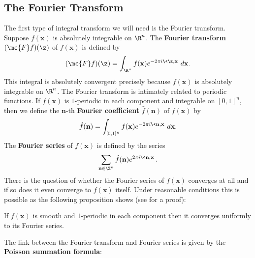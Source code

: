     \subsection*{The Fourier Transform}
      The first type of integral transform we will need is the Fourier transform. Suppose $f(\mathbf{x})$ is absolutely integrable on $\R^{n}$. The \textbf{Fourier transform} $(\mc{F}f)(\boldsymbol{\z})$ of $f(\mathbf{x})$ is defined by
      \[
        (\mc{F}f)(\boldsymbol{\z}) = \int_{\R^{n}}f(\mathbf{x})e^{-2\pi i\<\boldsymbol{\z},\mathbf{x}\>}\,d\mathbf{x}.
      \]
      This integral is absolutely convergent precisely because $f(\mathbf{x})$ is absolutely integrable on $\R^{n}$. The Fourier transform is intimately related to periodic functions. If $f(\mathbf{x})$ is $1$-periodic in each component and integrable on $[0,1]^{n}$, then we define the $\mathbf{n}$-th \textbf{Fourier coefficient} $\hat{f}(\mathbf{n})$ of $f(\mathbf{x})$ by
      \[
        \hat{f}(\mathbf{n}) = \int_{[0,1]^{n}}f(\mathbf{x})e^{-2\pi i\<\mathbf{n},\mathbf{x}\>}\,d\mathbf{x}.
      \]
      The \textbf{Fourier series} of $f(\mathbf{x})$ is defined by the series
      \[
        \sum_{\mathbf{n} \in \Z^{n}}\hat{f}(\mathbf{n})e^{2\pi i\<\mathbf{n},\mathbf{x}\>}.
      \]
      There is the question of whether the Fourier series of $f(\mathbf{x})$ converges at all and if so does it even converge to $f(\mathbf{x})$ itself. Under reasonable conditions this is possible as the following proposition shows (see \cite{grafakos2008classical} for a proof):

      \begin{proposition}
        If $f(\mathbf{x})$ is smooth and $1$-periodic in each component then it converges uniformly to its Fourier series.
      \end{proposition}

      The link between the Fourier transform and Fourier series is given by the \textbf{Poisson summation formula}:

